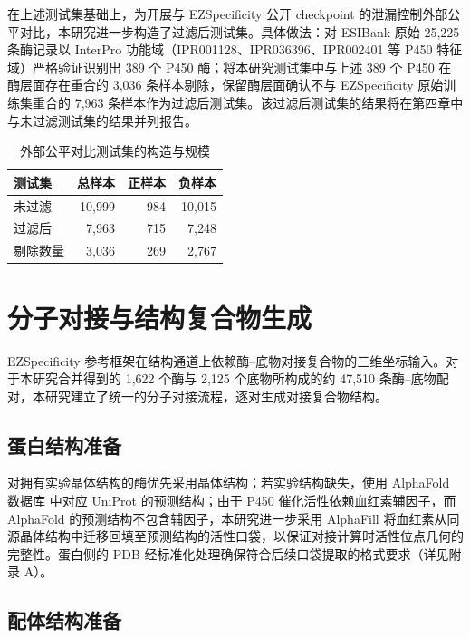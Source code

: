 在上述测试集基础上，为开展与 EZSpecificity 公开 checkpoint 的泄漏控制外部公平对比，本研究进一步构造了过滤后测试集。具体做法：对 ESIBank 原始 25{,}225 条酶记录以 InterPro\cite{Blum2025} 功能域（IPR001128、IPR036396、IPR002401 等 P450 特征域）严格验证识别出 389 个 P450 酶；将本研究测试集中与上述 389 个 P450 在酶层面存在重合的 3{,}036 条样本剔除，保留酶层面确认不与 EZSpecificity 原始训练集重合的 7{,}963 条样本作为过滤后测试集。该过滤后测试集的结果将在第四章中与未过滤测试集的结果并列报告。

\begin{table}[htbp]
  \centering
  \caption{外部公平对比测试集的构造与规模}
  \label{tab:ch3-filter}
  \begin{tabular}{lrrr}
    \toprule
    测试集 & 总样本 & 正样本 & 负样本 \\
    \midrule
    未过滤     & 10{,}999 & 984  & 10{,}015 \\
    过滤后     & 7{,}963  & 715  & 7{,}248  \\
    剔除数量   & 3{,}036  & 269  & 2{,}767  \\
    \bottomrule
  \end{tabular}
\end{table}

\section{分子对接与结构复合物生成}
\label{sec:docking}

EZSpecificity 参考框架在结构通道上依赖酶--底物对接复合物的三维坐标输入。对于本研究合并得到的 1{,}622 个酶与 2{,}125 个底物所构成的约 47{,}510 条酶--底物配对，本研究建立了统一的分子对接流程，逐对生成对接复合物结构。

\subsection{蛋白结构准备}
\label{subsec:dock-protein}

对拥有实验晶体结构的酶优先采用晶体结构；若实验结构缺失，使用 AlphaFold 数据库\cite{Varadi2024} 中对应 UniProt 的预测结构；由于 P450 催化活性依赖血红素辅因子，而 AlphaFold 的预测结构不包含辅因子，本研究进一步采用 AlphaFill\cite{AlphaFill2023} 将血红素从同源晶体结构中迁移回填至预测结构的活性口袋，以保证对接计算时活性位点几何的完整性。蛋白侧的 PDB 经标准化处理确保符合后续口袋提取的格式要求（详见附录 A）。

\subsection{配体结构准备}
\label{subsec:dock-ligand}

